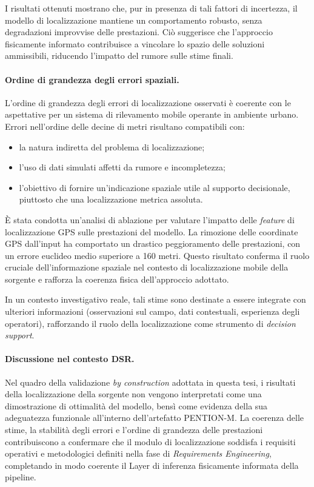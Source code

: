 I risultati ottenuti mostrano che, pur in presenza di tali fattori di incertezza, il modello di localizzazione mantiene un comportamento robusto, senza degradazioni improvvise delle prestazioni.
Ciò suggerisce che l’approccio fisicamente informato contribuisce a vincolare lo spazio delle soluzioni ammissibili, riducendo l’impatto del rumore sulle stime finali.

\paragraph{Ordine di grandezza degli errori spaziali.}
L’ordine di grandezza degli errori di localizzazione osservati è coerente con le aspettative per un sistema di rilevamento mobile operante in ambiente urbano.
Errori nell’ordine delle decine di metri risultano compatibili con:
\begin{itemize}
    \item la natura indiretta del problema di localizzazione;
    \item l’uso di dati simulati affetti da rumore e incompletezza;
    \item l’obiettivo di fornire un’indicazione spaziale utile al supporto decisionale, piuttosto che una localizzazione metrica assoluta.
\end{itemize}

È stata condotta un’analisi di ablazione per valutare l’impatto delle \textit{feature} di localizzazione GPS sulle prestazioni del modello.
La rimozione delle coordinate GPS dall’input ha comportato un drastico peggioramento delle prestazioni, con un errore euclideo medio superiore a 160 metri.
Questo risultato conferma il ruolo cruciale dell’informazione spaziale nel contesto di localizzazione mobile della sorgente e rafforza la coerenza fisica dell’approccio adottato.

In un contesto investigativo reale, tali stime sono destinate a essere integrate con ulteriori informazioni (osservazioni sul campo, dati contestuali, esperienza degli operatori), rafforzando il ruolo della localizzazione come strumento di \emph{decision support}.

\paragraph{Discussione nel contesto DSR.}
Nel quadro della validazione \emph{by construction} adottata in questa tesi, i risultati della localizzazione della sorgente non vengono interpretati come una dimostrazione di ottimalità del modello, bensì come evidenza della sua adeguatezza funzionale all’interno dell’artefatto \textsc{PENTION-M}.
La coerenza delle stime, la stabilità degli errori e l’ordine di grandezza delle prestazioni contribuiscono a confermare che il modulo di localizzazione soddisfa i requisiti operativi e metodologici definiti nella fase di \emph{Requirements Engineering}, completando in modo coerente il Layer di inferenza fisicamente informata della pipeline.

